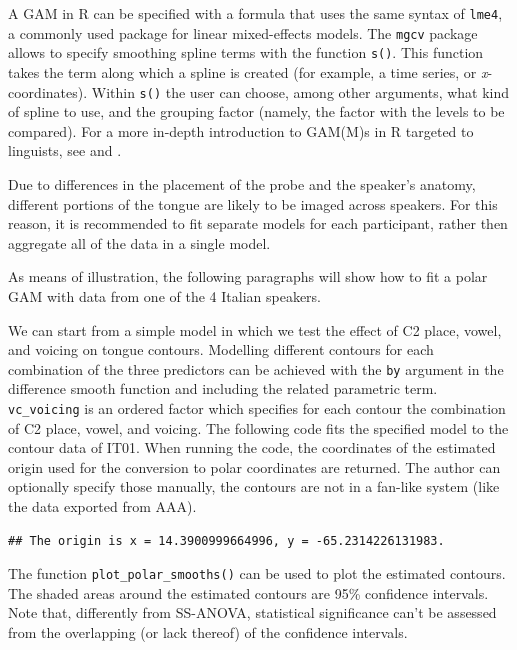 \documentclass[12pt,]{article}
\begin{document}
A GAM in R can be specified with a formula that uses the same syntax of
\texttt{lme4}, a commonly used package for linear mixed-effects models.
The \texttt{mgcv} package allows to specify smoothing spline terms with
the function \texttt{s()}. This function takes the term along which a
spline is created (for example, a time series, or \emph{x}-coordinates).
Within \texttt{s()} the user can choose, among other arguments, what
kind of spline to use, and the grouping factor (namely, the factor with
the levels to be compared). For a more in-depth introduction to GAM(M)s
in R targeted to linguists, see \citet{soskuthy2017} and
\citet{wieling2017}.

Due to differences in the placement of the probe and the speaker's
anatomy, different portions of the tongue are likely to be imaged across
speakers. For this reason, it is recommended to fit separate models for
each participant, rather then aggregate all of the data in a single
model.

As means of illustration, the following paragraphs will show how to fit
a polar GAM with data from one of the 4 Italian speakers.

We can start from a simple model in which we test the effect of C2
place, vowel, and voicing on tongue contours. Modelling different
contours for each combination of the three predictors can be achieved
with the \texttt{by} argument in the difference smooth function and
including the related parametric term. \texttt{vc\_voicing} is an
ordered factor which specifies for each contour the combination of C2
place, vowel, and voicing. The following code fits the specified model
to the contour data of IT01. When running the code, the coordinates of
the estimated origin used for the conversion to polar coordinates are
returned. The author can optionally specify those manually, the contours
are not in a fan-like system (like the data exported from AAA).

\begin{verbatim}
## The origin is x = 14.3900999664996, y = -65.2314226131983.
\end{verbatim}

The function \texttt{plot\_polar\_smooths()} can be used to plot the
estimated contours. The shaded areas around the estimated contours are
95\% confidence intervals. Note that, differently from SS-ANOVA,
statistical significance can't be assessed from the overlapping (or lack
thereof) of the confidence intervals.
\end{document}
